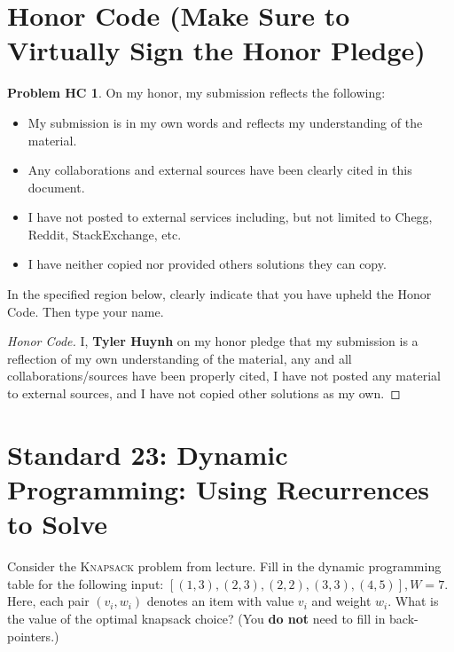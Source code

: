 \documentclass[11pt]{article}
\theoremstyle{definition}
\theoremstyle{definition}
\newtheorem*{requiredHC}{Problem HC}
\theoremstyle{definition}
\begin{document}
\section*{Honor Code (Make Sure to Virtually Sign the Honor Pledge)} 
\hypertarget{HonorCode}{}

\begin{requiredHC}
On my honor, my submission reflects the following:
\begin{itemize}
\item My submission is in my own words and reflects my understanding of the material.
\item Any collaborations and external sources have been clearly cited in this document.
\item I have not posted to external services including, but not limited to Chegg, Reddit, StackExchange, etc.
\item I have neither copied nor provided others solutions they can copy.
\end{itemize}

\noindent In the specified region below, clearly indicate that you have upheld the Honor Code. Then type your name. 
\end{requiredHC}

\begin{proof}[Honor Code]
I, \textbf{Tyler Huynh} on my honor pledge that my submission is a reflection of my own understanding of the material, any and all collaborations/sources have been properly cited, I have not posted any material to external sources, and I have not copied other solutions as my own.
\end{proof}

\newpage
\section{Standard 23: Dynamic Programming: Using Recurrences to Solve}
Consider the \textsc{Knapsack} problem from lecture. Fill in the dynamic programming table for the following input: $[(1, 3), (2, 3), (2, 2), (3, 3), (4, 5)], W=7$. Here, each pair $(v_i, w_i)$ denotes an item with value $v_i$ and weight $w_i$. What is the value of the optimal knapsack choice? (You \textbf{do not} need to fill in back-pointers.)
\end{document}
